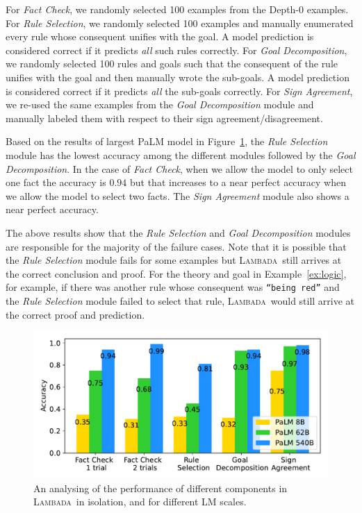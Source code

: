 \documentclass[11pt]{article}
\newcommand{\algo}{\textsc{Lambada}}
\newcommand{\module}[1]{\emph{#1}}
\begin{document}
For \module{Fact Check}, we randomly selected 100 examples from the Depth-0 examples. 
For \module{Rule Selection}, we randomly selected 100 examples and manually enumerated every rule whose consequent unifies with the goal. A model prediction is considered correct if it predicts \emph{all} such rules correctly. For \module{Goal Decomposition}, we randomly selected 100 rules and goals such that the consequent of the rule unifies with the goal and then manually wrote the sub-goals. A model prediction is considered correct if it predicts \emph{all} the sub-goals correctly. For \module{Sign Agreement}, we re-used the same examples from the \module{Goal Decomposition} module and manually labeled them with respect to their sign agreement/disagreement.

Based on the results of largest PaLM model in Figure~\ref{fig:component_analysis}, the \module{Rule Selection} module has the lowest accuracy among the different modules followed by the \module{Goal Decomposition}. In the case of \module{Fact Check}, when we allow the model to only select one fact the accuracy is $0.94$ but that increases to a near perfect accuracy when we allow the model to select two facts. The \module{Sign Agreement} module also shows a near perfect accuracy.

The above results show that the \module{Rule Selection} and \module{Goal Decomposition} modules are responsible for the majority of the failure cases. Note that it is possible that the \module{Rule Selection} module fails for some examples but \algo\ still arrives at the correct conclusion and proof. For the theory and goal in Example~\ref{ex:logic}, for example, if there was another rule whose consequent was \texttt{``being red''} and the \module{Rule Selection} module failed to select that rule, \algo\ would still arrive at the correct proof and prediction.

\begin{figure}[t]
  \centering
  \includegraphics[width=\columnwidth]{component_analysis.pdf}
  \caption{%
  \label{fig:component_analysis} %
    An analysing of the performance of different components in \algo\ in isolation, and for different LM scales.
  }
\end{figure}
\end{document}
